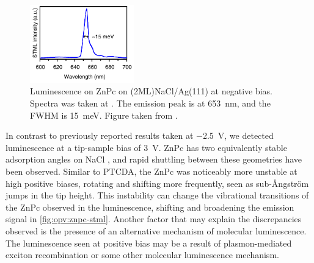 \begin{figure}
    \centering
    \includegraphics[width=0.4\textwidth]{pictures/znpc_literature.PNG}
    \caption[Luminescence on ZnPc on (2ML)NaCl/Ag(111) at negative bias. Spectra was taken at . The emission peak is at \SI{653}{nm}, and the FWHM is \SI{15}{meV}. ]{Luminescence on ZnPc on (2ML)NaCl/Ag(111) at negative bias. Spectra was taken at . The emission peak is at \SI{653}{nm}, and the FWHM is \SI{15}{meV}. Figure taken from \citep{zhang2017sub}.}
    \label{fig:opv:znpc_literature}
\end{figure}


In contrast to previously reported results taken at \SI{-2.5}{V}, we detected luminescence at a tip-sample bias of \SI{3}{V}. ZnPc has two equivalently stable adsorption angles on NaCl \citep{Miwa2016}, and rapid shuttling between these geometries have been observed. Similar to PTCDA, the ZnPc was noticeably more unstable at high positive biases, rotating and shifting more frequently, seen as sub-\AA ngstr\"om jumps in the tip height. This instability can change the vibrational transitions of the ZnPc observed in the luminescence, shifting and broadening the emission signal in \autoref{fig:opv:znpc-stml}. Another factor that may explain the discrepancies observed is the presence of an alternative mechanism of molecular luminescence. The luminescence seen at positive bias may be a result of plasmon-mediated exciton recombination or some other molecular luminescence mechanism.










